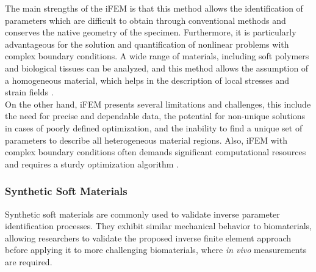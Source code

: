 The main strengths of the iFEM is that this method allows the identification of parameters which are difficult to obtain 
through conventional methods and conserves the native geometry of the specimen. Furthermore, it is particularly advantageous for the 
solution and quantification of nonlinear problems with complex boundary conditions. A wide 
range of materials, including soft polymers and biological tissues can be analyzed, and this method allows the 
assumption of a homogeneous material, which helps in the description of local stresses and strain fields \cite{Seshaiyer2003}.\\

On the other hand, iFEM presents several limitations and challenges, this include the need for precise and dependable 
data, the potential for non-unique solutions in cases of poorly defined optimization, and the inability to find a 
unique set of parameters to describe all heterogeneous material regions. Also, iFEM with complex boundary conditions often demands
significant computational resources and requires a sturdy optimization algorithm \cite{Giudice2021}.\\

\subsubsection*{Synthetic Soft Materials}
Synthetic soft materials are commonly used to validate inverse parameter identification processes. 
They exhibit similar mechanical behavior to biomaterials, allowing researchers to validate the proposed 
inverse finite element approach before applying it to more challenging biomaterials, where \textit{in vivo} measurements are required.

